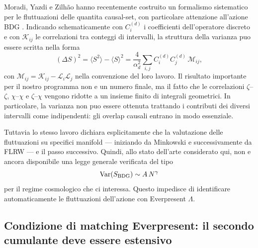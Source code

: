 \documentclass[11pt,a4paper]{article}
\begin{document}
Moradi, Yazdi e Zilh\~ao hanno recentemente costruito un formalismo sistematico per le fluttuazioni delle quantita causal-set, con particolare attenzione all'azione BDG \cite{MoradiYazdiZilhao2025}. Indicando schematicamente con $C_i^{(d)}$ i coefficienti dell'operatore discreto e con $\mathcal K_{ij}$ le correlazioni tra conteggi di intervalli, la struttura della varianza puo essere scritta nella forma
\begin{equation}
 (\Delta S)^2
 =\langle S^2\rangle-\langle S\rangle^2
 =\frac{4}{\alpha_d^2}
 \sum_{i,j}C_i^{(d)}C_j^{(d)}\,\mathcal M_{ij},
 \label{eq:r12k_variance_matrix}
\end{equation}
con $\mathcal M_{ij}=\mathcal K_{ij}-\mathcal L_i\mathcal L_j$ nella convenzione del loro lavoro. Il risultato importante per il nostro programma non e un numero finale, ma il fatto che le correlazioni $\zeta$--$\zeta$, $\chi$--$\chi$ e $\zeta$--$\chi$ vengono ridotte a un insieme finito di integrali geometrici. In particolare, la varianza non puo essere ottenuta trattando i contributi dei diversi intervalli come indipendenti: gli overlap causali entrano in modo essenziale.

Tuttavia lo stesso lavoro dichiara esplicitamente che la valutazione delle fluttuazioni su specifici manifold --- iniziando da Minkowski e successivamente da FLRW --- e il passo successivo. Quindi, allo stato dell'arte considerato qui, non e ancora disponibile una legge generale verificata del tipo
\begin{equation}
 \mathrm{Var}(S_{\rm BDG})\sim A\,N^\gamma
 \label{eq:r12k_gamma_def}
\end{equation}
per il regime cosmologico che ci interessa. Questo impedisce di identificare automaticamente le fluttuazioni dell'azione con Everpresent $\Lambda$.

\subsection{Condizione di matching Everpresent: il secondo cumulante deve essere estensivo}
\end{document}
